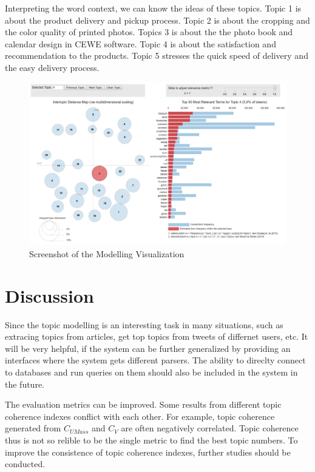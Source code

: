 \documentclass{article} %
\begin{document}
Interpreting the word context, we can know the ideas of these topics. Topic 1 is about the product delivery and pickup process. Topic 2 is about the cropping and the color quality of printed photos. Topics 3 is about the the photo book and calendar design in CEWE software. Topic 4 is about the satisfaction and recommendation to the products. Topic 5 stresses the quick speed of delivery and the easy delivery process.

\begin{figure}[H]
      \graphicspath{ {images/} }
      \begin{center}
            \includegraphics[scale=0.4325, angle=0]{vis_result.png}
      \end{center}
      \caption{Screenshot of the Modelling Visualization}
\end{figure}

\section{Discussion}
Since the topic modelling is an interesting task in many situations, such as extracing topics from articles, get top topics from tweets of differnet users, etc. It will be very helpful, if the system can be further generalized by providing an interfaces where the system gets different parsers. The ability to direclty connect to databases and run queries on them should also be included in the system in the future.

The evaluation metrics can be improved. Some results from different topic coherence indexes conflict with each other. For example, topic coherence generated from $C_{UMass}$ \cite{mimno_optimizing_nodate} and $C_V$ \cite{roder_exploring_2015} are often negatively correlated. Topic coherence thus is not so relible to be the single metric to find the best topic numbers. To improve the consistence of topic coherence indexes, further studies should be conducted.
\end{document}
